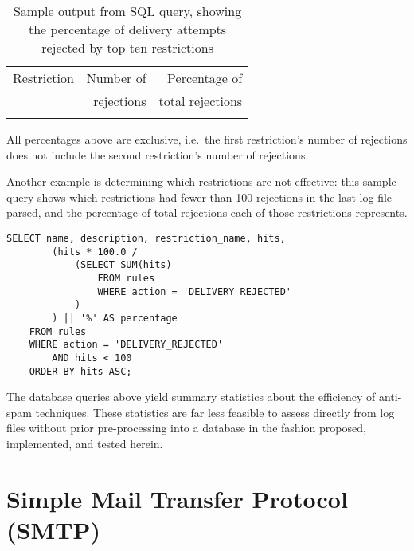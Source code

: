 \begin{table}[thbp]
    \caption{Sample output from SQL query, showing the percentage of
    delivery attempts rejected by top ten restrictions}
    \empty{}\label{Sample output from SQL query}
    \begin{tabular}[]{lrr}
        \tabletopline{}%
        Restriction & Number of  & Percentage of    \\
                    & rejections & total rejections \\
        \tablemiddleline{}%
        
        \tablebottomline{}%
    \end{tabular}

    All percentages above are exclusive, i.e.\ the first restriction's
    number of rejections does not include the second restriction's number
    of rejections.

\end{table}


Another example is determining which restrictions are not effective: this
sample query shows which restrictions had fewer than 100 rejections in the
last log file parsed, and the percentage of total rejections each of those
restrictions represents.

\begin{verbatim}
SELECT name, description, restriction_name, hits,
        (hits * 100.0 /
            (SELECT SUM(hits)
                FROM rules
                WHERE action = 'DELIVERY_REJECTED'
            )
        ) || '%' AS percentage
    FROM rules
    WHERE action = 'DELIVERY_REJECTED'
        AND hits < 100
    ORDER BY hits ASC;
\end{verbatim}

The database queries above yield summary statistics about the efficiency of
anti-spam techniques.  These statistics are far less feasible to assess
directly from log files without prior pre-processing into a database in the
fashion proposed, implemented, and tested herein.

\section{Simple Mail Transfer Protocol (SMTP)}

